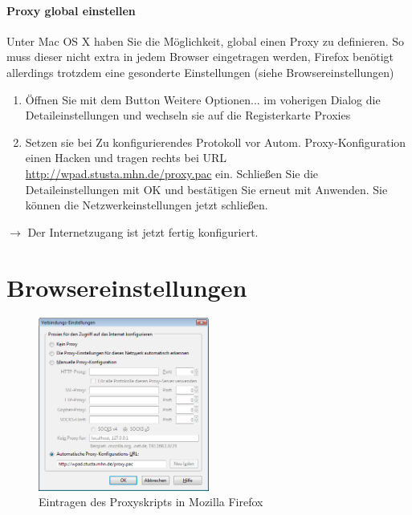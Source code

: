 \documentclass[a4paper,12pt,draft]{scrartcl}
\begin{document}
\paragraph*{Proxy global einstellen}
Unter Mac OS X haben Sie die Möglichkeit, global einen Proxy zu definieren. So muss dieser nicht extra in jedem Browser eingetragen werden, Firefox benötigt allerdings trotzdem eine gesonderte Einstellungen (siehe Browsereinstellungen)
\begin{enumerate}
    \item Öffnen Sie mit dem Button Weitere Optionen... im voherigen Dialog die Detaileinstellungen und wechseln sie auf die Registerkarte Proxies
    \item Setzen sie bei Zu konfigurierendes Protokoll vor Autom. Proxy-Konfiguration einen Hacken und tragen rechts bei URL \url{http://wpad.stusta.mhn.de/proxy.pac} ein. Schließen Sie die Detaileinstellungen mit OK und bestätigen Sie erneut mit Anwenden. Sie können die Netzwerkeinstellungen jetzt schließen.
\end{enumerate}
$\rightarrow$ Der Internetzugang ist jetzt fertig konfiguriert.

\newpage

\section*{Browsereinstellungen}

\begin{figure}
  \begin{center}
    \includegraphics[width=0.5\textwidth,keepaspectratio]{Bilder/Proxy_Firefox}
  \end{center}
  \caption{Eintragen des Proxyskripts in Mozilla Firefox}
\end{figure}
\end{document}
